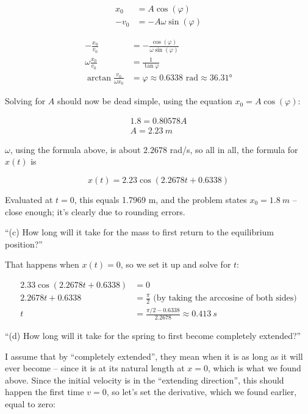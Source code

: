 \documentclass[12pt,a4paper]{report}
\begin{document}
\begin{align}
x_0  &= A \cos(\varphi)\\
-v_0 &= -A \omega \sin(\varphi)
\end{align}

\begin{align}
-\frac{x_0}{v_0}  &= -\frac{\cos(\varphi)}{\omega \sin(\varphi)}\\
\omega \frac{x_0}{v_0}  &= \frac{1}{\tan \varphi}\\
\arctan \frac{v_0}{\omega x_0}  &= \varphi \approx 0.6338 \text{ rad} \approx \ang{36.31}
\end{align}

Solving for $A$ should now be dead simple, using the equation $x_0 = A \cos(\varphi)$:

\begin{align}
1.8 = 0.80578 A\\
A = \SI{2.23}{m}
\end{align}

$\omega$, using the formula above, is about $2.2678$ rad/s, so all in all, the formula for $x(t)$ is

\begin{equation}
x(t) = 2.23 \cos(2.2678 t + 0.6338)
\end{equation}

Evaluated at $t = 0$, this equals 1.7969 m, and the problem states $x_0 = \SI{1.8}{m}$ -- close enough; it's clearly due to rounding errors.

``(c) How long will it take for the mass to first return to the equilibrium position?''

That happens when $x(t) = 0$, so we set it up and solve for $t$:

\begin{align}
2.33 \cos(2.2678 t + 0.6338) &= 0\\
2.2678 t + 0.6338 &= \frac{\pi}{2} \text{ (by taking the arccosine of both sides)}\\
t &= \frac{\pi/2 - 0.6338}{2.2678} \approx \SI{0.413}{s}
\end{align}

``(d) How long will it take for the spring to first become completely extended?''

I assume that by ``completely extended'', they mean when it is as long as it will ever become -- since it is at its natural length at $x = 0$, which is what we found above. Since the initial velocity is in the ``extending direction'', this should happen the first time $v = 0$, so let's set the derivative, which we found earlier, equal to zero:
\end{document}
